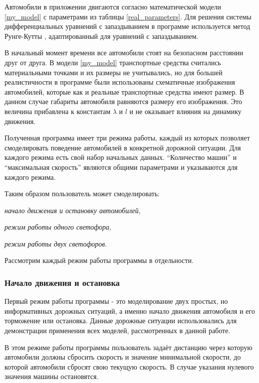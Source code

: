 \documentclass[12pt, a4paper]{extarticle}
\renewenvironment{itemize}[1][{---\hfil}]{\begin{list}{#1}{\topsep=0pt\parsep=0pt plus 1pt\itemsep=\parsep\leftmargin=0pt \itemindent=\parindent}\addtolength{\itemindent}{\labelwidth}}{\end{list}}
\numberwithin{equation}{section}
\numberwithin{figure}{section}
\begin{document}
Автомобили в приложении двигаются согласно математической модели \eqref{my_model} с параметрами из таблицы \ref{real_parameters}. Для решения системы дифференциальных уравнений с запаздыванием в программе используется метод Рунге-Кутты \cite{Runge_Kutta}, адаптированный для уравнений с запаздыванием.

В начальный момент времени все автомобили стоят на безопасном расстоянии друг от друга. В модели \eqref{my_model} транспортные средства считались материальными точками и их размеры не учитывались, но для большей реалистичности в программе были использованы схематичные изображения автомобилей, которые как и реальные транспортные средства имеют размер. В данном случае габариты автомобиля равняются размеру его изображения. Это величина прибавлена к константам $\lambda$ и $l$ и не оказывает влияния на динамику движения.

Полученная программа имеет три режима работы, каждый из которых позволяет смоделировать поведение автомобилей в конкретной дорожной ситуации. Для каждого режима есть свой набор начальных данных. ``Количество машин'' и ``максимальная скорость'' являются общими параметрами и указываются для каждого режима.

\noindent Таким образом пользователь может смоделировать:

\begin{itemize} 
	\item \textit{начало движения и остановку автомобилей},
	\item \textit{режим работы одного светофора},
	\item \textit{режим работы двух светофоров}.
\end{itemize}

\noindent Рассмотрим каждый режим работы программы в отдельности.

\subsubsection{Начало движения и остановка}

Первый режим работы программы - это моделирование двух простых, но информативных дорожных ситуаций, а именно начало движения автомобиля и его торможение или остановка. Данные дорожные ситуации использовались для демонстрации применения всех моделей, рассмотренных в данной работе.

В этом режиме работы программы пользователь задаёт дистанцию через которую автомобили должны сбросить скорость и значение минимальной скорости, до которой автомобили сбросят свою текущую скорость. В случае указания нулевого значения машины остановятся.
\end{document}
